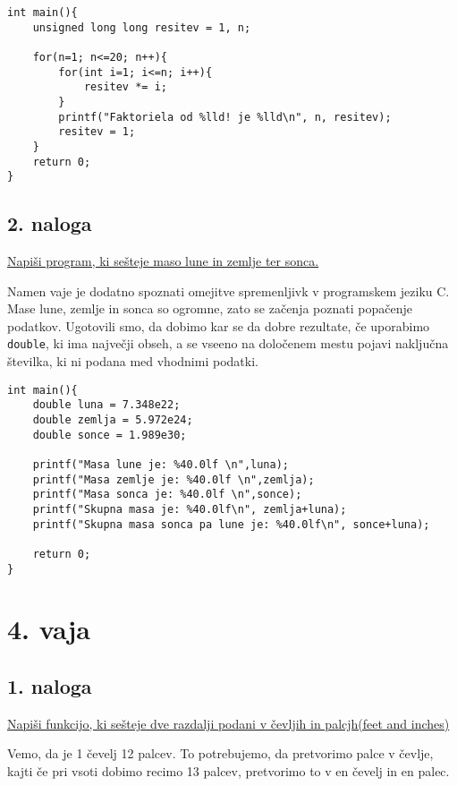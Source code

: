 \documentclass[a4paper, 12pt]{article}
\begin{document}
\pagebreak

\begin{lstlisting}
int main(){
	unsigned long long resitev = 1, n;

	for(n=1; n<=20; n++){
		for(int i=1; i<=n; i++){
			resitev *= i;
		}
		printf("Faktoriela od %lld! je %lld\n", n, resitev);
		resitev = 1;
	}
	return 0;
}
\end{lstlisting}

\subsection*{2. naloga}
	
\underline{Napiši program, ki sešteje maso lune in zemlje ter sonca.}\

Namen vaje je dodatno spoznati omejitve spremenljivk v programskem jeziku C. Mase lune, zemlje in sonca so ogromne, zato se začenja poznati popačenje podatkov. Ugotovili smo, da dobimo kar se da dobre rezultate, če uporabimo \lstinline|double|, ki ima največji obseh, a se vseeno na določenem mestu pojavi naključna številka, ki ni podana med vhodnimi podatki.

\begin{lstlisting}
int main(){
	double luna = 7.348e22;
	double zemlja = 5.972e24;
	double sonce = 1.989e30;
	
	printf("Masa lune je: %40.0lf \n",luna);
	printf("Masa zemlje je: %40.0lf \n",zemlja);
	printf("Masa sonca je: %40.0lf \n",sonce);
	printf("Skupna masa je: %40.0lf\n", zemlja+luna);
	printf("Skupna masa sonca pa lune je: %40.0lf\n", sonce+luna);
	
	return 0;
}
\end{lstlisting}

\section*{4. vaja}
\subsection*{1. naloga}

\underline{Napiši funkcijo, ki sešteje dve razdalji podani v čevljih in palcjh(feet and inches)}\

Vemo, da je 1 čevelj 12 palcev. To potrebujemo, da pretvorimo palce v čevlje, kajti če pri vsoti dobimo recimo 13 palcev, pretvorimo to v en čevelj in en palec.
\end{document}
